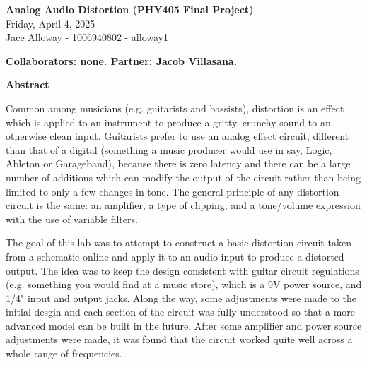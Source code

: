 \documentclass[11pt]{article}
\begin{document}
\begin{center}
    \Large {}  \textbf{Analog Audio Distortion (PHY405 Final Project)}\\
    \vspace{5pt} 
    \large Friday, April 4, 2025\\
    \vspace{5pt}
    Jace Alloway - 1006940802 - alloway1
\end{center}

\nd \hrulefill

\vspace{10pt}

\nd{}\selectfont \textbf{Collaborators: none. Partner: Jacob Villasana.} 

\vspace{10pt}

 \selectfont 

\nd \textbf{Abstract}

\vspace{5pt}

\selectfont Common among musicians (e.g. guitarists and bassists), distortion is an effect which is applied to an instrument to produce a gritty, crunchy sound to an otherwise clean input. Guitarists prefer to use an analog effect circuit, different than that of a digital (something a music producer would use in say, Logic, Ableton or Garageband), because there is zero latency and there can be a large number of additions which can modify the output of the circuit rather than being limited to only a few changes in tone. The general principle of any distortion circuit is the same: an amplifier, a type of clipping, and a tone/volume expression with the use of variable filters. 

The goal of this lab was to attempt to construct a basic distortion circuit taken from a schematic online and apply it to an audio input to produce a distorted output. The idea was to keep the design consistent with guitar circuit regulations (e.g. something you would find at a music store), which is a 9V power source, and 1/4" input and output jacks. Along the way, some adjustments were made to the initial desgin and each section of the circuit was fully understood so that a more advanced model can be built in the future. After some amplifier and power source adjustments were made, it was found that the circuit worked quite well across a whole range of frequencies. 
\end{document}
